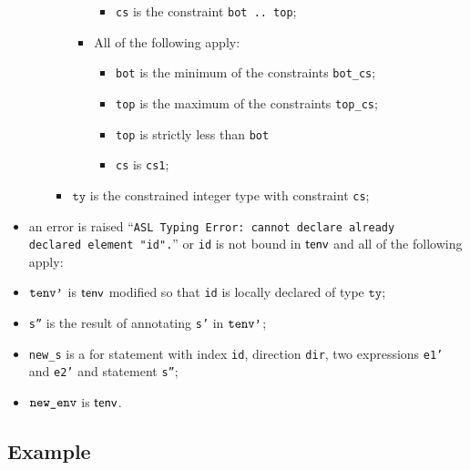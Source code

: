 \documentclass{book}
\newcommand\tty[0]{\texttt{ty}}
\begin{document}
\begin{itemize}
\begin{itemize}
\begin{itemize}
\begin{itemize}
\begin{itemize}
                   \item \texttt{cs} is the constraint \texttt{bot .. top};
                 \end{itemize}
               \item All of the following apply:
                 \begin{itemize}
                   \item \texttt{bot} is the minimum of the constraints \texttt{bot\_cs};
                   \item \texttt{top} is the maximum of the constraints \texttt{top\_cs};
                   \item \texttt{top} is strictly less than \texttt{bot}
                   \item \texttt{cs} is \texttt{cs1};
                 \end{itemize}
             \end{itemize}
           \item $\tty$ is the constrained integer type with constraint \texttt{cs};
         \end{itemize}
     \end{itemize}
   \item an error is raised ``\texttt{ASL Typing Error: cannot declare already \\ declared element "id".}'' or \texttt{id} is not bound in $\textsf{tenv}$ and all of the following apply:
   \item $\texttt{tenv'}$ is $\textsf{tenv}$ modified so that \texttt{id} is locally declared of type $\tty$;
   \item \texttt{s''} is the result of annotating \texttt{s'} in $\texttt{tenv'}$;
   \item \texttt{new\_s} is a for statement with index \texttt{id}, direction \texttt{dir}, two expressions \texttt{e1'} and \texttt{e2'} and statement \texttt{s''};
   \item $\texttt{new\_env}$ is $\textsf{tenv}$.
   \end{itemize}

  \subsection{Example}


\end{document}
